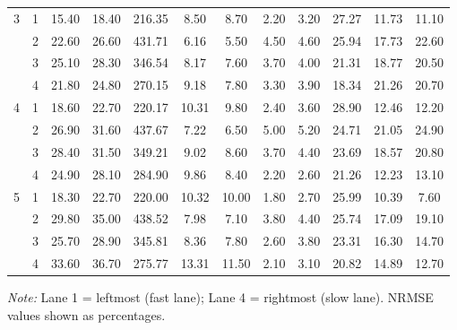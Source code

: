 \documentclass{scspaperproc}
\theoremstyle{scsthe}
\begin{document}
\begin{table}[htbp]
\begin{tabular}{cc|ccccc|ccccc}
        \hline
        3 & 1 & 15.40 & 18.40 & 216.35 & 8.50 & 8.70 & 2.20 & 3.20 & 27.27 & 11.73 & 11.10 \\
          & 2 & 22.60 & 26.60 & 431.71 & 6.16 & 5.50 & 4.50 & 4.60 & 25.94 & 17.73 & 22.60 \\
          & 3 & 25.10 & 28.30 & 346.54 & 8.17 & 7.60 & 3.70 & 4.00 & 21.31 & 18.77 & 20.50 \\
          & 4 & 21.80 & 24.80 & 270.15 & 9.18 & 7.80 & 3.30 & 3.90 & 18.34 & 21.26 & 20.70 \\
        \hline
        4 & 1 & 18.60 & 22.70 & 220.17 & 10.31 & 9.80 & 2.40 & 3.60 & 28.90 & 12.46 & 12.20 \\
          & 2 & 26.90 & 31.60 & 437.67 & 7.22 & 6.50 & 5.00 & 5.20 & 24.71 & 21.05 & 24.90 \\
          & 3 & 28.40 & 31.50 & 349.21 & 9.02 & 8.60 & 3.70 & 4.40 & 23.69 & 18.57 & 20.80 \\
          & 4 & 24.90 & 28.10 & 284.90 & 9.86 & 8.40 & 2.20 & 2.60 & 21.26 & 12.23 & 13.10 \\
        \hline
        5 & 1 & 18.30 & 22.70 & 220.00 & 10.32 & 10.00 & 1.80 & 2.70 & 25.99 & 10.39 & 7.60 \\
          & 2 & 29.80 & 35.00 & 438.52 & 7.98 & 7.10 & 3.80 & 4.40 & 25.74 & 17.09 & 19.10 \\
          & 3 & 25.70 & 28.90 & 345.81 & 8.36 & 7.80 & 2.60 & 3.80 & 23.31 & 16.30 & 14.70 \\
          & 4 & 33.60 & 36.70 & 275.77 & 13.31 & 11.50 & 2.10 & 3.10 & 20.82 & 14.89 & 12.70 \\
        \hline
    \end{tabular}
      \vspace{0.5em}
    \begin{flushleft}
        \footnotesize
        \textit{Note:} Lane 1 = leftmost (fast lane); Lane 4 = rightmost (slow lane). NRMSE values shown as percentages.
    \end{flushleft}
\end{table}
\end{document}
